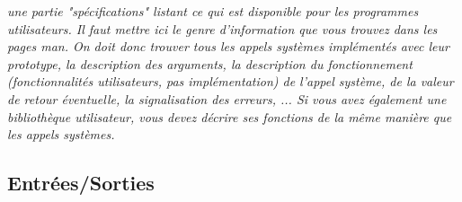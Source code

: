 \documentclass{article}
\begin{document}
\textit{
une partie "spécifications" listant ce qui est disponible pour les programmes utilisateurs. Il faut mettre ici le genre d'information que vous trouvez dans les pages man. On doit donc trouver tous les appels systèmes implémentés avec leur prototype, la description des arguments, la description du fonctionnement (fonctionnalités utilisateurs, pas implémentation) de l'appel système, de la valeur de retour éventuelle, la signalisation des erreurs, ... Si vous avez également une bibliothèque utilisateur, vous devez décrire ses fonctions de la même manière que les appels systèmes.
}



\subsection{Entrées/Sorties}
\end{document}
